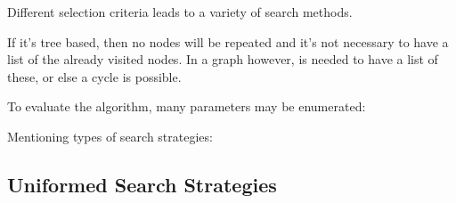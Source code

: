 Different selection criteria leads to a variety of search methods.

If it's tree based, then no nodes will be repeated and it's not necessary to have a list of the already visited nodes. In a graph however, is needed to have a list of these, or else a cycle is possible.

To evaluate the algorithm, many parameters may be enumerated:


\vspace{.5cm}
Mentioning types of search strategies:



\subsection{Uniformed Search Strategies}

